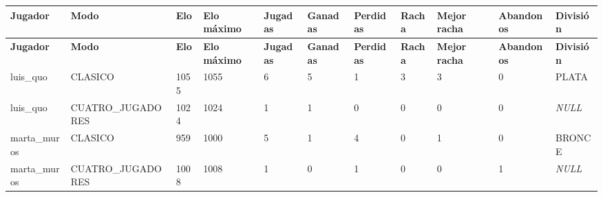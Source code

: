 \begin{center}\scriptsize\setlength{\tabcolsep}{2pt}
\begin{longtable}{|L{42.0pt}|L{78.5pt}|L{20.1pt}|L{39.0pt}|L{37.5pt}|L{40.2pt}|L{26.9pt}|L{31.8pt}|L{29.1pt}|L{35.2pt}|L{42.4pt}|}
\hline
\textbf{\hspace{0pt}Jugador} & \textbf{\hspace{0pt}Modo} & \textbf{\hspace{0pt}Elo} & \textbf{\hspace{0pt}Elo máximo} & \textbf{\hspace{0pt}Jugadas} & \textbf{\hspace{0pt}Ganadas} & \textbf{\hspace{0pt}Perdidas} & \textbf{\hspace{0pt}Racha} & \textbf{\hspace{0pt}Mejor racha} & \textbf{\hspace{0pt}Abandonos} & \textbf{\hspace{0pt}División} \\ \hline
\endfirsthead
\hline
\textbf{\hspace{0pt}Jugador} & \textbf{\hspace{0pt}Modo} & \textbf{\hspace{0pt}Elo} & \textbf{\hspace{0pt}Elo máximo} & \textbf{\hspace{0pt}Jugadas} & \textbf{\hspace{0pt}Ganadas} & \textbf{\hspace{0pt}Perdidas} & \textbf{\hspace{0pt}Racha} & \textbf{\hspace{0pt}Mejor racha} & \textbf{\hspace{0pt}Abandonos} & \textbf{\hspace{0pt}División} \\ \hline
\endhead
luis\_\allowbreak{}quo & CLASICO & 1055 & 1055 & 6 & 5 & 1 & 3 & 3 & 0 & PLATA \\ \hline
luis\_\allowbreak{}quo & CUATRO\_\allowbreak{}JUGADORES & 1024 & 1024 & 1 & 1 & 0 & 0 & 0 & 0 & \textit{NULL} \\ \hline
marta\_\allowbreak{}muros & CLASICO & 959 & 1000 & 5 & 1 & 4 & 0 & 1 & 0 & BRONCE \\ \hline
marta\_\allowbreak{}muros & CUATRO\_\allowbreak{}JUGADORES & 1008 & 1008 & 1 & 0 & 1 & 0 & 0 & 1 & \textit{NULL} \\ \hline

\end{longtable}
\end{center}
